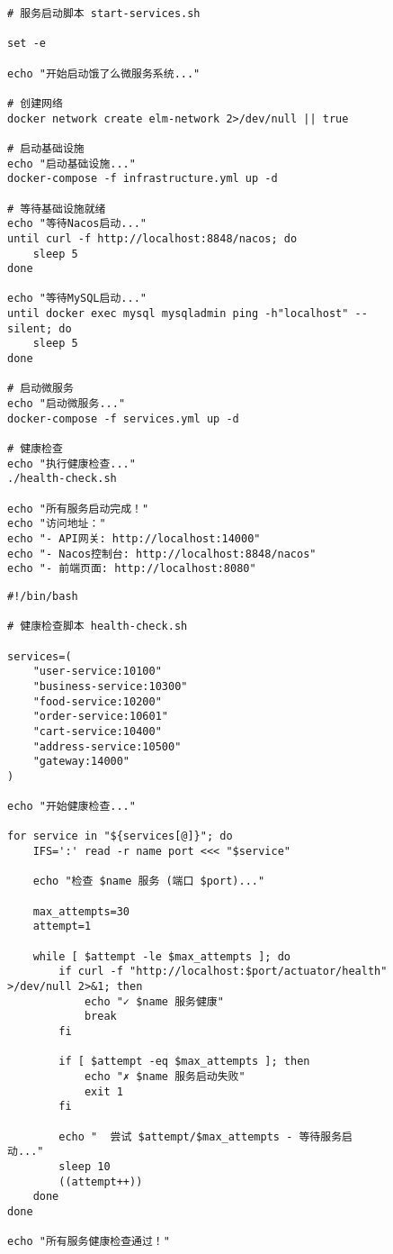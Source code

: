 \documentclass[a4paper,12pt]{article}
\begin{document}
\begin{figure}[H]
\begin{lstlisting}[caption=服务启动脚本]
# 服务启动脚本 start-services.sh

set -e

echo "开始启动饿了么微服务系统..."

# 创建网络
docker network create elm-network 2>/dev/null || true

# 启动基础设施
echo "启动基础设施..."
docker-compose -f infrastructure.yml up -d

# 等待基础设施就绪
echo "等待Nacos启动..."
until curl -f http://localhost:8848/nacos; do
    sleep 5
done

echo "等待MySQL启动..."
until docker exec mysql mysqladmin ping -h"localhost" --silent; do
    sleep 5
done

# 启动微服务
echo "启动微服务..."
docker-compose -f services.yml up -d

# 健康检查
echo "执行健康检查..."
./health-check.sh

echo "所有服务启动完成！"
echo "访问地址："
echo "- API网关: http://localhost:14000"
echo "- Nacos控制台: http://localhost:8848/nacos"
echo "- 前端页面: http://localhost:8080"
\end{lstlisting}

\begin{lstlisting}[caption=健康检查脚本]
#!/bin/bash

# 健康检查脚本 health-check.sh

services=(
    "user-service:10100"
    "business-service:10300"
    "food-service:10200"
    "order-service:10601"
    "cart-service:10400"
    "address-service:10500"
    "gateway:14000"
)

echo "开始健康检查..."

for service in "${services[@]}"; do
    IFS=':' read -r name port <<< "$service"
    
    echo "检查 $name 服务 (端口 $port)..."
    
    max_attempts=30
    attempt=1
    
    while [ $attempt -le $max_attempts ]; do
        if curl -f "http://localhost:$port/actuator/health" >/dev/null 2>&1; then
            echo "✓ $name 服务健康"
            break
        fi
        
        if [ $attempt -eq $max_attempts ]; then
            echo "✗ $name 服务启动失败"
            exit 1
        fi
        
        echo "  尝试 $attempt/$max_attempts - 等待服务启动..."
        sleep 10
        ((attempt++))
    done
done

echo "所有服务健康检查通过！"
\end{lstlisting}


\end{figure}
\end{document}
